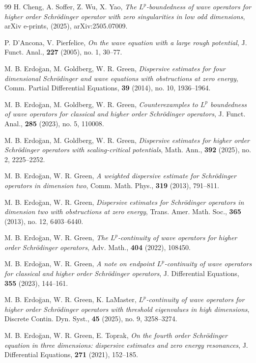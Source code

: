 \documentclass[reqno]{amsart}
\numberwithin{equation}{section}
\begin{document}
\begin{thebibliography}{99}
H. Cheng, A. Soffer, Z. Wu, X. Yao,
\emph{The $L^p$-boundedness of wave operators for higher order Schr\"{o}dinger operator with zero singularities in low odd dimensions},
arXiv e-prints, (2025), arXiv:2505.07009.

P. D'Ancona, V. Pierfelice,
\emph{On the wave equation with a large rough potential}, J. Funct. Anal., \textbf{227} (2005),
no. 1, 30--77.

M. B. Erdo\u{g}an, M. Goldberg, W. R. Green,
\emph{Dispersive estimates for four dimensional Schr\"{o}dinger and wave equations with obstructions at zero energy}, Comm. Partial Differential Equations, \textbf{39} (2014), no. 10, 1936--1964.

 M. B. Erdo\u{g}an, M. Goldberg, W. R. Green, \emph{Counterexamples to $L^p$ boundedness of wave operators for classical and higher order Schr\"odinger operators}, J. Funct. Anal., \textbf{285} (2023), no. 5, 110008.

 M. B. Erdo\u{g}an, M. Goldberg, W. R. Green, \emph{Dispersive estimates for higher order Schr\"odinger operators with scaling-critical potentials}, Math. Ann., \textbf{392} (2025), no. 2, 2225--2252.

M. B. Erdo\u{g}an, W. R. Green, \emph{A weighted dispersive estimate for Schr\"{o}dinger
operators in dimension two}, Comm. Math. Phys., \textbf{319} (2013), 791--811.

M. B. Erdo\u{g}an, W. R. Green, \emph{Dispersive estimates for Schr\"{o}dinger operators
 in dimension two with obstructions at zero energy}, Trans. Amer. Math. Soc., \textbf{365} (2013), no. 12, 6403--6440.

M. B. Erdo\u{g}an, W. R. Green, \emph{The $L^p$-continuity of wave operators for higher order
Schr\"{o}dinger operators}, Adv. Math., \textbf{404} (2022), 108450.

 M. B. Erdo\u{g}an, W. R. Green, \emph{A note on endpoint $L^p$-continuity of wave operators for classical and higher order Schr\"odinger operators}, J. Differential Equations, \textbf{355} (2023), 144--161.

 M. B. Erdo\u{g}an, W. R. Green, K. LaMaster, \emph
{$L^p$-continuity of wave operators for higher order Schr\"odinger operators with threshold eigenvalues in high dimensions}, Discrete Contin. Dyn. Syst.,
 \textbf{45} (2025), no. 9,  3258--3274.

M. B. Erdo\u{g}an, W. R. Green, E. Toprak, \emph{On the fourth order 
Schr\"{o}dinger equation in three dimensions: dispersive estimates and
 zero energy resonances}, J. Differential Equations, \textbf{271} (2021), 152--185.


\end{thebibliography}
\end{document}
